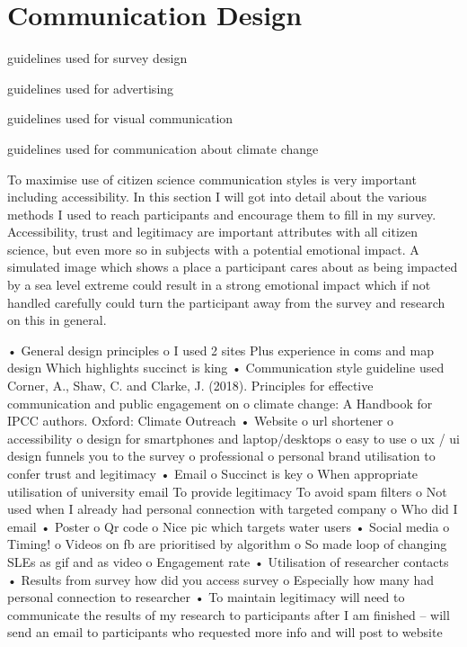 \section{Communication Design}
guidelines used for survey design

guidelines used for advertising

guidelines used for visual communication

guidelines used for communication about climate change

To maximise use of citizen science communication styles is very important including accessibility. In this section I will got into detail about the various methods I used to reach participants and encourage them to fill in my survey. Accessibility, trust and legitimacy are important attributes with all citizen science, but even more so in subjects with a potential emotional impact. A simulated image which shows a place a participant cares about as being impacted by a sea level extreme could result in a strong emotional impact which if not handled carefully could turn the participant away from the survey and research on this in general.


•	General design principles
o	 I used 2 sites 
Plus experience in coms and map design
Which highlights succinct is king
•	Communication style guideline used
Corner, A., Shaw, C. and Clarke, J. (2018). Principles for effective communication and public engagement on
o	climate change: A Handbook for IPCC authors. Oxford: Climate Outreach 
•	Website 
o	url shortener
o	accessibility
o	design for smartphones and laptop/desktops
o	easy to use
o	ux / ui design funnels you to the survey
o	professional 
o	personal brand utilisation to confer trust and legitimacy
•	Email
o	 Succinct is key
o	When appropriate utilisation of university email
	To provide legitimacy
	To avoid spam filters
o	Not used when I already had personal connection with targeted company
o	Who did I email 
•	Poster
o	Qr code
o	Nice pic which targets water users
•	Social media
o	Timing!
o	Videos on fb are prioritised by algorithm
o	So made loop of changing SLEs as gif and as video
o	Engagement rate
•	Utilisation of researcher contacts
•	Results from survey how did you access survey
o	Especially how many had personal connection to researcher
•	To maintain legitimacy will need to communicate the results of my research to participants after I am finished – will send an email to participants who requested more info and will post to website 


